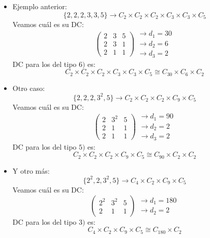 \documentclass[11pt,a4paper]{article}
\begin{document}
\begin{itemize}
\item Ejemplo anterior:
$$\{2, 2, 2, 3, 3, 5\} \to C_{2} \times C_{2} \times C_{2} \times C_{3} \times C_{3} \times C_{5}$$
Veamos cuál es su DC:
\begin{equation*}
\begin{pmatrix}
2 & 3 & 5 \\
2 & 3 & 1 \\
2 & 1 & 1
\end{pmatrix}
\begin{matrix}
\to d_{1} = 30 \\
\to d_{2} = 6 \\
\to d_{3} = 2
\end{matrix}
\end{equation*}
DC para los del tipo $6)$ es:
$$C_{2} \times C_{2} \times C_{2} \times C_{3} \times C_{3} \times C_{5} \cong C_{30} \times C_{6} \times C_{2}$$


\item Otro caso:
$$\{2, 2, 2, 3^{2}, 5\} \to C_{2} \times C_{2} \times C_{2} \times C_{9} \times C_{5}$$
Veamos cuál es su DC:
\begin{equation*}
\begin{pmatrix}
2 & 3^{2} & 5 \\
2 & 1 & 1 \\
2 & 1 & 1
\end{pmatrix}
\begin{matrix}
\to d_{1} = 90 \\
\to d_{2} = 2 \\
\to d_{3} = 2
\end{matrix}
\end{equation*}
DC para los del tipo $5)$ es:
$$C_{2} \times C_{2} \times C_{2} \times C_{9} \times C_{5} \cong C_{90} \times C_{2} \times C_{2}$$

\item Y otro más:
$$\{2^{2}, 2, 3^{2}, 5\} \to C_{4} \times C_{2} \times C_{9} \times C_{5}$$
Veamos cuál es su DC:
\begin{equation*}
\begin{pmatrix}
2^{2} & 3^{2} & 5 \\
2 & 1 & 1
\end{pmatrix}
\begin{matrix}
\to d_{1} = 180 \\
\to d_{2} = 2
\end{matrix}
\end{equation*}
DC para los del tipo $3)$ es:
$$C_{4} \times C_{2} \times C_{9} \times C_{5} \cong C_{180} \times C_{2}$$
\end{itemize}
\end{document}
